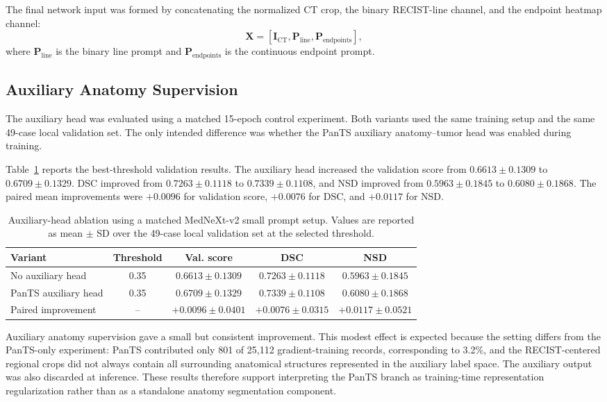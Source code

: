 The final network input was formed by concatenating the normalized CT crop, the binary RECIST-line channel, and the endpoint heatmap channel:
\[
\mathbf{X}
=
\left[
\mathbf{I}_{\mathrm{CT}},
\mathbf{P}_{\mathrm{line}},
\mathbf{P}_{\mathrm{endpoints}}
\right],
\]
where \(\mathbf{P}_{\mathrm{line}}\) is the binary line prompt and \(\mathbf{P}_{\mathrm{endpoints}}\) is the continuous endpoint prompt.



\subsection{Auxiliary Anatomy Supervision}
\label{sec:auxiliary_head_ablation}

The auxiliary head was evaluated using a matched 15-epoch control experiment. Both variants used the same training setup and the same 49-case local validation set. The only intended difference was whether the PanTS auxiliary anatomy--tumor head was enabled during training.

Table~\ref{tab:aux_head_ablation_main} reports the best-threshold validation results. The auxiliary head increased the validation score from \(0.6613 \pm 0.1309\) to \(0.6709 \pm 0.1329\). DSC improved from \(0.7263 \pm 0.1118\) to \(0.7339 \pm 0.1108\), and NSD improved from \(0.5963 \pm 0.1845\) to \(0.6080 \pm 0.1868\). The paired mean improvements were \(+0.0096\) for validation score, \(+0.0076\) for DSC, and \(+0.0117\) for NSD.

\begin{table}[htbp]
\centering
\caption{
Auxiliary-head ablation using a matched MedNeXt-v2 small prompt setup.
Values are reported as mean \(\pm\) SD over the 49-case local validation set at the selected threshold.
}
\label{tab:aux_head_ablation_main}
\begin{tabular}{lcccc}
\toprule
\textbf{Variant} & \textbf{Threshold} & \textbf{Val. score} & \textbf{DSC} & \textbf{NSD} \\
\midrule
No auxiliary head
& 0.35
& \(0.6613 \pm 0.1309\)
& \(0.7263 \pm 0.1118\)
& \(0.5963 \pm 0.1845\) \\
PanTS auxiliary head
& 0.35
& \(\mathbf{0.6709 \pm 0.1329}\)
& \(\mathbf{0.7339 \pm 0.1108}\)
& \(\mathbf{0.6080 \pm 0.1868}\) \\
\midrule
Paired improvement
& --
& \(+0.0096 \pm 0.0401\)
& \(+0.0076 \pm 0.0315\)
& \(+0.0117 \pm 0.0521\) \\
\bottomrule
\end{tabular}
\end{table}

Auxiliary anatomy supervision gave a small but consistent improvement. This modest effect is expected because the setting differs from the PanTS-only experiment: PanTS contributed only 801 of 25,112 gradient-training records, corresponding to 3.2\%, and the RECIST-centered regional crops did not always contain all surrounding anatomical structures represented in the auxiliary label space. The auxiliary output was also discarded at inference. These results therefore support interpreting the PanTS branch as training-time representation regularization rather than as a standalone anatomy segmentation component.


